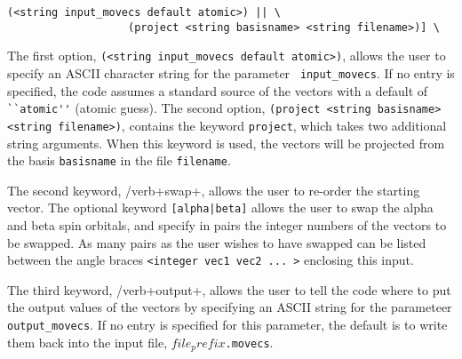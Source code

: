 \begin{verbatim}
(<string input_movecs default atomic>) || \
                   (project <string basisname> <string filename>)] \

\end{verbatim}

The first option, \verb+(<string input_movecs default atomic>)+, allows
the user to specify an ASCII character string for the parameter {\tt 
input_movecs}.
If no entry is specified, the code assumes a
standard source of the vectors with a default of \verb+``atomic''+ 
(atomic guess).  The second option, 
\verb+(project <string basisname> <string filename>)+, contains the
keyword \verb+project+, which takes two additional string arguments.
When this keyword is used, the vectors will be projected from the basis
\verb+basisname+ in the file \verb+filename+.

The second keyword, /verb+swap+, allows the user to re-order the starting
vector.  The optional keyword \verb+[alpha|beta]+ allows the user to swap
the alpha and beta spin orbitals, and specify in pairs the integer numbers
of the vectors to be swapped.  As many pairs as the user wishes to have
swapped can be listed between the angle braces \verb+<integer vec1 vec2 ... >+
enclosing this input.

The third keyword, /verb+output+, allows the user to tell the code where
to put the output values of the vectors by specifying an ASCII string
for the parameteer {\tt output_movecs}.  If no entry is specified for
this parameter, the default is to write them
back into the input file, {\tt $file_prefix$.movecs}.


